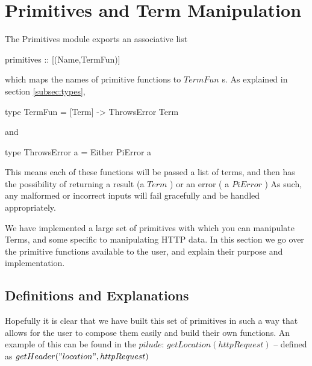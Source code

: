 \section{Primitives and Term Manipulation}
\label{sec:primitives}

The Primitives module exports an associative list 
\begin{code}
primitives :: [(Name,TermFun)]
\end{code} 
which maps the names of primitive functions to $TermFun$ s. As explained in section \ref{subsec:types}, 
\begin{code}
    type TermFun = [Term] -> ThrowsError Term
\end{code}
and
\begin{code}
    type ThrowsError a = Either PiError a
\end{code}
This means each of these functions will be passed a list of terms, and then has the possibility of returning a result (a $Term$ ) or an error ( a $PiError$ )
As such, any malformed or incorrect inputs will fail gracefully and be handled appropriately.

We have implemented a large set of primitives with which you can manipulate Terms, and some specific to manipulating HTTP data. In this section we go over the primitive functions available to the user, and explain their purpose and implementation.
 
\subsection{Definitions and Explanations}



Hopefully it is clear that we have built this set of primitives in such a way that allows for the user to compose them easily and build their own functions. An example of this can be found in the $pilude$: $getLocation(httpRequest)$ -- defined as $getHeader("location",httpRequest)$

